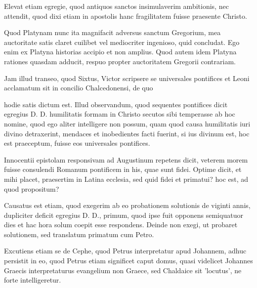 Elevat etiam egregie, quod antiquos sanctos insimulaverim ambitionis, nec attendit, quod dixi etiam in apostolis hanc fragilitatem fuisse praesente Christo.

Quod Platynam nunc ita magnifacit adversus sanctum Gregorium, mea auctoritate satis claret cuilibet vel mediocriter ingenioso, quid concludat. Ego enim ex Platyna historias accipio et non amplius. Quod autem idem Platyna rationes quasdam adducit, respuo propter auctoritatem Gregorii contrariam.

Jam illud transeo, quod Sixtus, Victor scripsere se universales pontifices et Leoni acclamatum sit in concilio Chalcedonensi, de quo

hodie satis dictum est. Illud observandum, quod sequentes pontifices dicit egregius D. D. humilitatis formam in Christo secutos sibi temperasse ab hoc nomine, quod ego aliter intelligere non possum, quam quod causa humilitatis iuri divino detraxerint, mendaces et inobedientes facti fuerint, si ius divinum est, hoc est praeceptum, fuisse eos universales pontifices.

Innocentii epistolam responsivam ad Augustinum repetens dicit, veterem morem fuisse consulendi Romanum pontificem in his, quae sunt fidei. Optime dicit, et mihi placet, praesertim in Latina ecclesia, sed quid fidei et primatui? hoc est, ad quod propositum?

Causatus est etiam, quod exegerim ab eo probationem solutionis de viginti annis, dupliciter deficit egregius D. D., primum, quod ipse fuit opponens semiquatuor dies et hac hora solum coepit esse respondens. Deinde non exegi, ut probaret solutionem, sed translatum primatum cum Petro.

Excutiens etiam se de Cephe, quod Petrus interpretatur apud Johannem, adhuc persistit in eo, quod Petrus etiam significet caput domus, quasi videlicet Johannes Graecis interpretaturus evangelium non Graece, sed Chaldaice sit 'locutus', ne forte intelligeretur.


